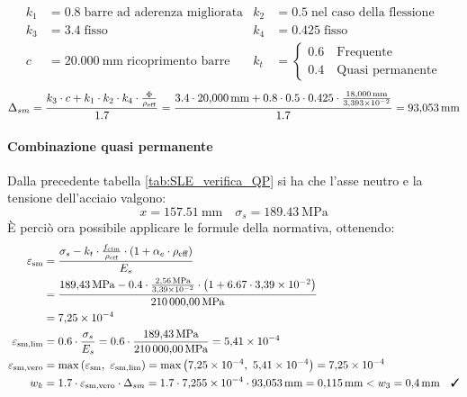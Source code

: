 \begin{align*}
k_{1} &= 0.8 \; \text{barre ad aderenza migliorata}  & k_{2} &= 0.5 \; \text{nel caso della flessione} \\
k_{3} &= 3.4 \; \text{fisso} & k_{4} &= 0.425 \;\text{fisso} \\
c &= \SI{20.000}{\milli\metre} \; \text{ricoprimento barre} & k_t &= 
    \begin{cases}
        0.6 \quad \text{Frequente} \\
        0.4 \quad \text{Quasi permanente}
    \end{cases}
\end{align*}
\[
    \Delta_{sm} = \frac{ k_{3} \cdot c + k_{1} \cdot k_{2} \cdot k_{4} \cdot \frac{ \Phi }{ \rho_\textup{eff} } }{ 1.7 }  = \frac{ 3.4 \cdot \SI{20.000}{\milli\metre} + 0.8 \cdot 0.5 \cdot 0.425 \cdot \frac{ \SI{18.000}{\milli\metre} }{\num{3.393e-2 } } }{ 1.7 } = \SI{93.053}{\milli\metre}  
\]
\paragraph{Combinazione quasi permanente}
Dalla precedente tabella \ref{tab:SLE_verifica_QP} si ha che l'asse neutro e la tensione dell'acciaio valgono:
\[
    x = \SI{157.51}{\milli\metre} \quad \sigma_{s} = \SI{189.43}{\mega\pascal}
\]
È perciò ora possibile applicare le formule della normativa, ottenendo:
\[
\begin{split}
    \varepsilon_\textup{sm} 
    &= \frac{ \sigma_{s} - k_{t} \cdot \frac{ f_\textup{ctm} }{ \rho_\textup{eff} } \cdot \left( 1 + \alpha_{e} \cdot \rho_\textup{eff} \right) }{ E_{s} }  \\
    &= \frac{ \SI{189.43}{\mega\pascal} - 0.4 \cdot \frac{ \SI{2.56}{\mega\pascal} }{\num{3.39e-2 } } \cdot \left( 1 + 6.67 \cdot\num{3.39e-2 } \right) }{ \SI{210000.00}{\mega\pascal} } \\
    &=\num{7.25e-4 }  \\
    \varepsilon_\textup{sm,lim} 
    &= 0.6 \cdot \frac{ \sigma_{s} }{ E_{s} }  
    = 0.6 \cdot \frac{ \SI{189.43}{\mega\pascal} }{ \SI{210000.00}{\mega\pascal} } =\num{5.41e-4 }  \\
    \varepsilon_\textup{sm,vero} 
    &= \max { \left( \varepsilon_\textup{sm} ,\  \varepsilon_\textup{sm,lim} \right) }  
    = \max { \left(\num{7.25e-4 } ,\ \num{5.41e-4 } \right) } 
    =\num{7.25e-4 }  \\
    w_{k} &=  1.7 \cdot \varepsilon_\textup{sm,vero} \cdot \Delta_{sm}  
    =  1.7 \cdot\num{7.255e-4 } \cdot \SI{93.053}{\milli\metre} 
    = \SI{0.115}{\milli\metre} < w_3 = \SI{0.4}{\milli\metre} \quad \checked\\
    \end{split}
    \]
    

